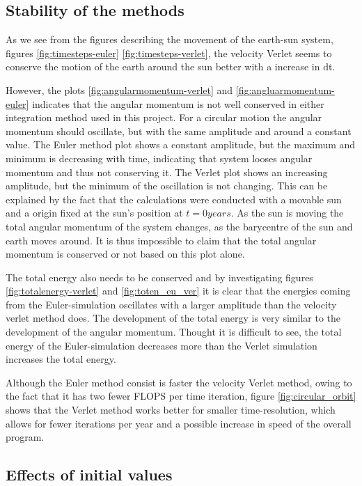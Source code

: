 
\subsection{Stability of the methods}

As we see from the figures describing the movement of the earth-sun system, figures  \ref{fig:timesteps-euler} \ref{fig:timesteps-verlet},  the velocity Verlet seems to conserve the motion of the earth around the sun better with a increase in dt. 

However, the plots  \ref{fig:angularmomentum-verlet} and
\ref{fig:angluarmomentum-euler} indicates that the angular momentum is not well conserved in either integration method used in this project. For a circular motion the angular momentum should oscillate, but with the same amplitude and around a constant value. The Euler method plot shows a constant amplitude, but the maximum and minimum is  decreasing with time, indicating that system looses angular momentum and thus not conserving it. The Verlet plot shows an increasing amplitude, but the minimum of the oscillation is not changing. This can be explained by the fact that the calculations were conducted with a movable sun and a origin fixed at the sun's position at $ t=0 years $. As the sun is moving the total angular momentum of the system changes, as the barycentre of the sun and earth moves around. It is thus impossible to claim that the total angular momentum is conserved or not based on this plot alone. 

The total energy also needs to be conserved and by investigating figures \ref{fig:totalenergy-verlet} and \ref{fig:toten_eu_ver} it is clear that the energies coming from the Euler-simulation oscillates with a larger amplitude than the velocity verlet method does. The development of the total energy is very similar to the development of the angular momentum. Thought it is difficult to see, the total energy of the Euler-simulation decreases more than the Verlet simulation increases the total energy. 

Although the Euler method consist is faster the velocity Verlet method, owing to the fact that it has two fewer FLOPS per time iteration, figure \ref{fig:circular_orbit} shows that the Verlet method works better for smaller time-resolution, which allows for fewer iterations per year and a possible increase in speed of the overall program. 


\subsection{Effects of initial values}

